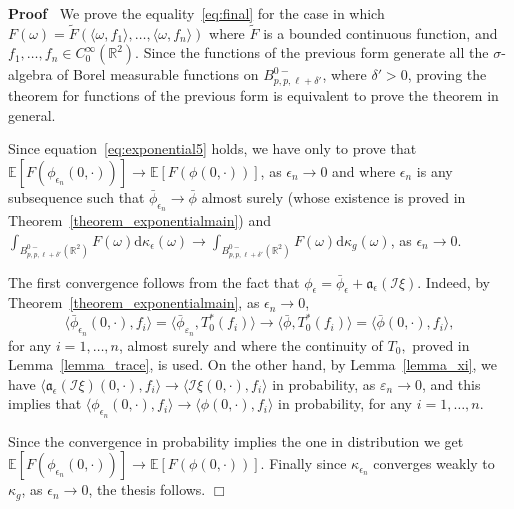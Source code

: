 \documentclass[a4paper,10pt]{article}
\newcommand{\asterisk}{\mathord{*}}
\newcommand{\mathd}{\mathrm{d}}
\newenvironment{proof}{\noindent\textbf{Proof\ }}{\hspace*{\fill}$\Box$\medskip}
\begin{document}
\begin{proof}
  We prove the equality~{\eqref{eq:final}} for the case in which $F (\omega) =
  \tilde{F} (\langle \omega, f_1 \rangle, \ldots, \langle \omega, f_n
  \rangle)$ where $\tilde{F}$ is a bounded continuous function, and $f_1,
  \ldots, f_n \in C^{\infty}_0 (\mathbb{R}^2)$. Since the functions of the
  previous form generate all the $\sigma$-algebra of Borel measurable
  functions on $B^{0 -}_{p, p, \ell + \delta'}$, where $\delta' > 0$, proving
  the theorem for functions of the previous form is equivalent to prove the
  theorem in general.
  
  Since equation~{\eqref{eq:exponential5}} holds, we have only to prove that
  $\mathbb{E} [F (\phi_{\epsilon_n} (0, \cdot))] \rightarrow \mathbb{E} [F
  (\phi (0, \cdot))]$, as $\epsilon_n \rightarrow 0$ and where $\epsilon_n$ is
  any subsequence such that $\bar{\phi}_{\epsilon_n} \rightarrow \bar{\phi}$
  almost surely (whose existence is proved in
  Theorem~\ref{theorem_exponentialmain}) and $\int_{B^{0 -}_{p, p, \ell +
  \delta'} (\mathbb{R}^2)} F (\omega) \mathd \kappa_{\epsilon} (\omega)
  \rightarrow \int_{B^{0 -}_{p, p, \ell + \delta'} (\mathbb{R}^2)} F (\omega)
  \mathd \kappa_g (\omega)$, as $\epsilon_n \rightarrow 0$.
  
  The first convergence follows from the fact that $\phi_{\epsilon} =
  \bar{\phi}_{\epsilon} + \mathcal{\mathfrak{a_{\epsilon} (\mathcal{I}
  \xi)}}$. Indeed, by Theorem~\ref{theorem_exponentialmain}, as $\epsilon_n
  \rightarrow 0$,
  \[ \langle \bar{\phi}_{\epsilon_n} (0, \cdot), f_i \rangle = \langle
     \bar{\phi}_{\varepsilon_n}, T^{\asterisk}_0 (f_i) \rangle \rightarrow
     \langle \bar{\phi}, T^{\asterisk}_0 (f_i) \rangle = \langle \bar{\phi}
     (0, \cdot), f_i \rangle, \]
  for any $i = 1, \ldots, n$, almost surely and where the continuity of $T_0,$
  proved in Lemma~\ref{lemma_trace}, is used. On the other hand, by
  Lemma~\ref{lemma_xi}, we have $\langle \mathfrak{a}_{\epsilon} (\mathcal{I}
  \xi) (0, \cdot), f_i \rangle \rightarrow \langle \mathcal{I} \xi
  (0, \cdot), f_i \rangle$ in probability, as $\varepsilon_n \rightarrow 0$,
  and this implies that $\langle \phi_{\epsilon_n} (0, \cdot), f_i \rangle
  \rightarrow \langle \phi (0, \cdot), f_i \rangle$ in probability, for any $i
  = 1, \ldots, n$.
  
  Since the convergence in probability implies the one in distribution we get
  $\mathbb{E} [F (\phi_{\epsilon_n} (0, \cdot))] \rightarrow \mathbb{E} [F
  (\phi (0, \cdot))]$. Finally since $\kappa_{\epsilon_n}$ converges weakly to
  $\kappa_g$, as $\epsilon_n \rightarrow 0$, the thesis follows. 
\end{proof}
\end{document}
